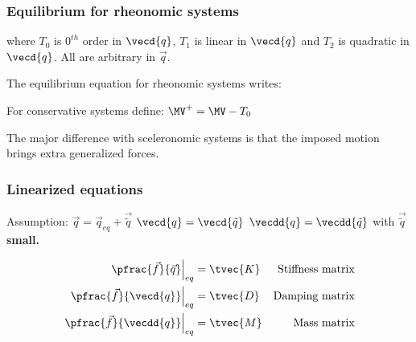 \documentclass[10pt,a4paper]{scrartcl}
\begin{document}
\begin{multicols*}{2}
\subsubsection{Equilibrium for rheonomic systems}


where $T_0$ is $0^{th}$ order in $\vecd{q}$, $T_1$ is linear in $\vecd{q}$ and $T_2$ is quadratic in $\vecd{q}$. All are arbitrary in $\vec{q}$.



The equilibrium equation for rheonomic systems writes:


For conservative systems define: $\MV^+=\MV - T_0$


The major difference with sceleronomic systems is that the imposed motion brings extra generalized forces.

\subsubsection{Linearized equations}

Assumption: $\vec{q}=\vec{q}_{eq}+\vec{\tilde{q}}$ $\vecd {q}=\vecd{\tilde{q}}$ $\vecdd{q}=\vecdd{\tilde{q}}$ with $\vec{\tilde{q}}$ \textbf{small.}


\begin{align*}
\left.\pfrac{\vec{f}}{\vec{q}}\right|_{eq}&=\tvec{K}&\text{Stiffness matrix}\\
\left.\pfrac{\vec{f}}{\vecd{q}}\right|_{eq}&=\tvec{D}&\text{Damping matrix}\\
\left.\pfrac{\vec{f}}{\vecdd{q}}\right|_{eq}&=\tvec{M}&\text{Mass matrix}
\end{align*}


\end{multicols*}
\end{document}
